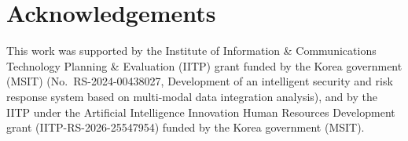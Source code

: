 \documentclass{article}
\begin{document}
\ninept


\clearpage
\section{Acknowledgements}
This work was supported by the Institute of Information \& Communications Technology Planning \& Evaluation (IITP) grant funded by the Korea government (MSIT) (No.~RS-2024-00438027, Development of an intelligent security and risk response system based on multi-modal data integration analysis), and by the IITP under the Artificial Intelligence Innovation Human Resources Development grant (IITP-RS-2026-25547954) funded by the Korea government (MSIT).



\end{document}
